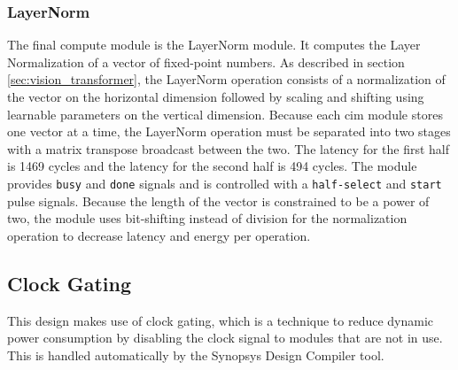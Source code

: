 \subsubsection{LayerNorm}
The final compute module is the LayerNorm module. It computes the Layer Normalization of a vector of fixed-point numbers. As described in section \ref{sec:vision_transformer}, the LayerNorm operation consists of a normalization of
the vector on the horizontal dimension followed by scaling and shifting using learnable parameters on the vertical dimension. Because each \ac{cim} module stores one vector at a time, the LayerNorm operation must be separated into
two stages with a matrix transpose broadcast between the two. The latency for the first half is 1469 cycles and the latency for the second half is 494 cycles. The module provides \texttt{busy} and \texttt{done} signals and is controlled
with a \texttt{half-select} and \texttt{start} pulse signals. Because the length of the vector is constrained to be a power of two, the module uses bit-shifting instead of division for the normalization operation to decrease latency and energy
per operation.

\subsection{Clock Gating}
This design makes use of clock gating, which is a technique to reduce dynamic power consumption by disabling the clock signal to modules that are not in use. This is handled automatically by the Synopsys Design Compiler tool.
